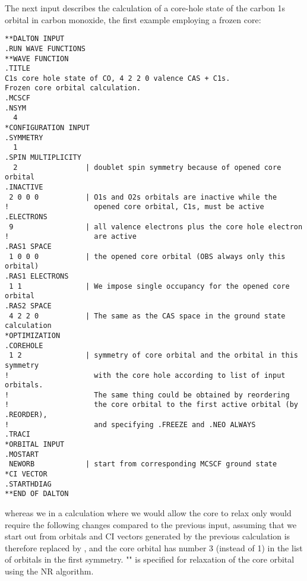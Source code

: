 \begin{center}
\end{center}

The next input describes the calculation of a core-hole state of the
carbon 1s orbital in carbon monoxide, the first
example employing a frozen core:

\begin{verbatim}
**DALTON INPUT
.RUN WAVE FUNCTIONS
**WAVE FUNCTION
.TITLE
C1s core hole state of CO, 4 2 2 0 valence CAS + C1s.
Frozen core orbital calculation.
.MCSCF
.NSYM
  4
*CONFIGURATION INPUT
.SYMMETRY
  1
.SPIN MULTIPLICITY
  2                | doublet spin symmetry because of opened core orbital
.INACTIVE
 2 0 0 0           | O1s and O2s orbitals are inactive while the
!                    opened core orbital, C1s, must be active
.ELECTRONS
 9                 | all valence electrons plus the core hole electron
!                    are active
.RAS1 SPACE
 1 0 0 0           | the opened core orbital (OBS always only this orbital)
.RAS1 ELECTRONS
 1 1               | We impose single occupancy for the opened core orbital
.RAS2 SPACE
 4 2 2 0           | The same as the CAS space in the ground state calculation
*OPTIMIZATION
.COREHOLE
 1 2               | symmetry of core orbital and the orbital in this symmetry
!                    with the core hole according to list of input orbitals.
!                    The same thing could be obtained by reordering
!                    the core orbital to the first active orbital (by .REORDER),
!                    and specifying .FREEZE and .NEO ALWAYS
.TRACI
*ORBITAL INPUT
.MOSTART
 NEWORB            | start from corresponding MCSCF ground state
*CI VECTOR
.STARTHDIAG
**END OF DALTON
\end{verbatim}
\label{sirius_ex6}


whereas we in a calculation where we would allow the core to
relax only would require the following changes
compared to the previous input, assuming that we start out from
orbitals and CI vectors generated by the previous calculation
 is therefore replaced by , and
the core orbital has number 3 (instead of 1) in the list of
orbitals in the first symmetry. "" is specified for
relaxation of the core orbital using the NR algorithm.

